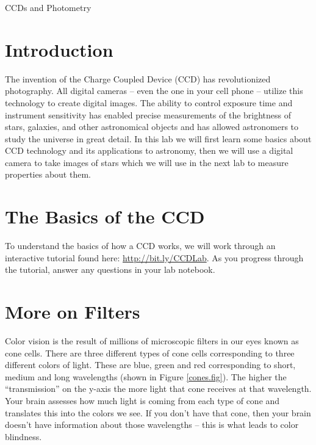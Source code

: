 \documentclass[10pt]{article}%
\begin{document}
\begin{center}
{\huge CCDs and Photometry}\\ 
\end{center}

\section{Introduction}
\indent\indent The invention of the Charge Coupled Device (CCD) has revolutionized photography. All digital cameras -- even the one in your cell phone -- utilize this technology to create digital images. The ability to control exposure time and instrument sensitivity has enabled precise measurements of the brightness of stars, galaxies, and other astronomical objects and has allowed astronomers to study the universe in great detail. In this lab we will first learn some basics about CCD technology and its applications to astronomy, then we will use a digital camera to take images of stars which we will use in the next lab to measure properties about them.

\section{The Basics of the CCD}
\indent\indent To understand the basics of how a CCD works, we will work through an interactive tutorial found here: \url{http://bit.ly/CCDLab}. As you progress through the tutorial, answer any questions in your lab notebook. 

\section{More on Filters}

Color vision is the result of millions of microscopic filters in our eyes known as cone cells. There are three different types of cone cells corresponding to three different colors of light. These are blue, green and red corresponding to short, medium and long wavelengths (shown in Figure \ref{cones.fig}). The higher the ``transmission'' on the y-axis the more light that cone receives at that wavelength. Your brain assesses how much light is coming from each type of cone and translates this into the colors we see. If you don't have that cone, then your brain doesn't have information about those wavelengths --  this is what leads to color blindness.
\end{document}
